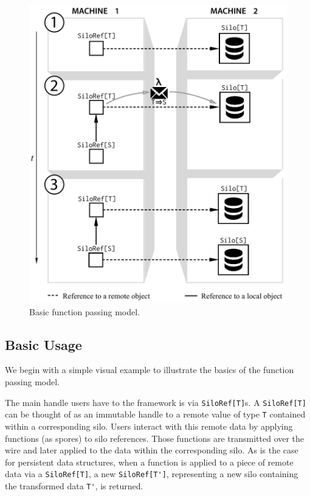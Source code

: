 \documentclass{jfp1}
\begin{document}

\begin{figure}[t!]
\centering\includegraphics[width=0.8\columnwidth]{pic/basic-diagram.pdf}
\caption{Basic function passing model.}\label{fig:basic-diagram}
\end{figure}

\subsection{Basic Usage}

We begin with a simple visual example to illustrate the basics of the function
passing model. %

The main handle users have to the framework is via
\verb|SiloRef[T]|s. A \verb|SiloRef[T]| can be thought of as an
immutable handle to a remote value of type \verb|T| contained within a
corresponding silo. Users interact with this remote data by applying
functions (as spores) to silo references. Those functions are
transmitted over the wire and later applied to the data within the
corresponding silo. As is the case for persistent data structures,
when a function is applied to a piece of remote data via a
\verb|SiloRef[T]|, a new \verb|SiloRef[T']|, representing a new silo
containing the transformed data \verb|T'|, is returned.
\end{document}
